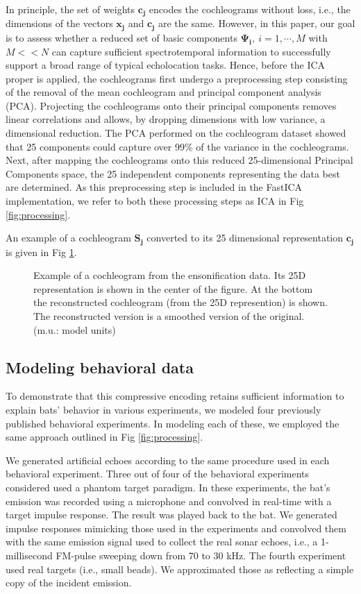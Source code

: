 \documentclass[10pt,letterpaper]{article}
\begin{document}
In principle, the set of weights $\mathbf{c_j}$ encodes the cochleograms without loss, i.e., the dimensions of the vectors $\mathbf{x_j}$ and $\mathbf{c_j}$ are the same. However, in this paper, our goal is to assess whether a reduced set of basic components $\mathbf{\Psi_i},\ i=1, \cdots, M$ with $M<<N$ can capture sufficient spectrotemporal information to successfully support a broad range of typical echolocation tasks. Hence, before the ICA proper is applied, the cochleograms first undergo a preprocessing step consisting of the removal of the mean cochleogram and principal component analysis (PCA). Projecting the cochleograms onto their principal components removes linear correlations and allows, by dropping dimensions with low variance, a dimensional reduction. The PCA performed on the cochleogram dataset showed that 25 components could capture over 99\% of the variance in the cochleograms. Next, after mapping the cochleograms onto this reduced 25-dimensional Principal Components space, the 25 independent components representing the data best are determined. As this preprocessing step is included in the FastICA implementation, we refer to both these processing steps as ICA in Fig \ref{fig:processing}.

An example of a cochleogram $\mathbf{S_j}$ converted to its 25 dimensional representation $\mathbf{c_j}$ is given in Fig \ref{fig:reconstruction}.


\begin{figure}[tb]
	\centering
	\caption{Example of a cochleogram from the ensonification data. Its 25D representation is shown in the center of the figure. At the bottom the reconstructed cochleogram (from the 25D represention) is shown. The reconstructed version is a smoothed version of the original. (m.u.: model units)}
	\label{fig:reconstruction}
\end{figure}

\subsection*{Modeling behavioral data}

To demonstrate that this compressive encoding retains sufficient information to explain bats' behavior in various experiments, we modeled four previously published behavioral experiments. In modeling each of these, we employed the same approach outlined in Fig \ref{fig:processing}.

We generated artificial echoes according to the same procedure used in each behavioral experiment. Three out of four of the behavioral experiments considered used a phantom target paradigm. In these experiments, the bat's emission was recorded using a microphone and convolved in real-time with a target impulse response. The result was played back to the bat. We generated impulse responses mimicking those used in the experiments and convolved them with the same emission signal used to collect the real sonar echoes, i.e., a 1-millisecond FM-pulse sweeping down from 70 to 30 kHz. The fourth experiment used real targets (i.e., small beads). We approximated those as reflecting a simple copy of the incident emission.
\end{document}
